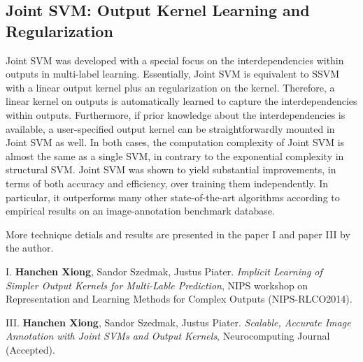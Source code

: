 \subsection{Joint SVM: Output Kernel Learning and Regularization }

Joint SVM was developed with a special focus on the interdependencies within outputs in multi-label learning.
Essentially, Joint SVM is equivalent to SSVM with a linear output kernel plus an regularization on the kernel.  
Therefore, a linear kernel on outputs is automatically learned to capture the interdependencies within outputs.  
Furthermore, if prior knowledge about the interdependencies is available, a user-specified output kernel can be 
straightforwardly mounted in Joint SVM as well.  
In both cases, the computation complexity of Joint SVM is almost the same as a single SVM, in contrary to the 
exponential complexity in structural SVM. 
Joint SVM was shown to yield substantial
improvements, in terms of both accuracy and efficiency, over
training them independently. In particular, it outperforms many
other state-of-the-art algorithms according to empirical results
on an image-annotation benchmark database. 

More technique detials and results are presented in the paper I and paper III by the author. 
\begin{shaded}
{\Huge I.} \textbf{Hanchen Xiong}, Sandor Szedmak, Justus Piater. {\it Implicit Learning of Simpler Output Kernels for Multi-Lable Prediction}, NIPS workshop on Representation and Learning Methods for Complex Outputs (NIPS-RLCO2014).  
\vspace{-.2cm}

{\Huge III.} \textbf{Hanchen Xiong}, Sandor Szedmak, Justus Piater. {\it Scalable, Accurate Image Annotation with Joint SVMs and Output Kernels}, Neurocomputing Journal (Accepted).  
\vspace{-.2cm}
\end{shaded}










